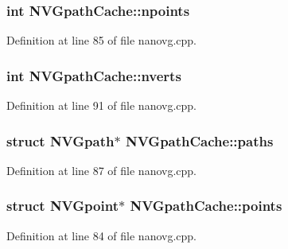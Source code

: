 \hypertarget{struct_n_v_gpath_cache_acafbab0856b18f16da4f3c89398e53c2}{
\subsubsection[{npoints}]{\setlength{\rightskip}{0pt plus 5cm}int N\+V\+Gpath\+Cache\+::npoints}}\label{struct_n_v_gpath_cache_acafbab0856b18f16da4f3c89398e53c2}


Definition at line 85 of file nanovg.\+cpp.

\hypertarget{struct_n_v_gpath_cache_a6ce92987c5d5829a029e9ad7cb6eb505}{
\subsubsection[{nverts}]{\setlength{\rightskip}{0pt plus 5cm}int N\+V\+Gpath\+Cache\+::nverts}}\label{struct_n_v_gpath_cache_a6ce92987c5d5829a029e9ad7cb6eb505}


Definition at line 91 of file nanovg.\+cpp.

\hypertarget{struct_n_v_gpath_cache_a2b8393b9e17cc58d52ce96eb62ed0ef0}{
\subsubsection[{paths}]{\setlength{\rightskip}{0pt plus 5cm}struct {\bf N\+V\+Gpath}$\ast$ N\+V\+Gpath\+Cache\+::paths}}\label{struct_n_v_gpath_cache_a2b8393b9e17cc58d52ce96eb62ed0ef0}


Definition at line 87 of file nanovg.\+cpp.

\hypertarget{struct_n_v_gpath_cache_a52ba47cd1caf7789aceba3632e4a6cd9}{
\subsubsection[{points}]{\setlength{\rightskip}{0pt plus 5cm}struct {\bf N\+V\+Gpoint}$\ast$ N\+V\+Gpath\+Cache\+::points}}\label{struct_n_v_gpath_cache_a52ba47cd1caf7789aceba3632e4a6cd9}


Definition at line 84 of file nanovg.\+cpp.


